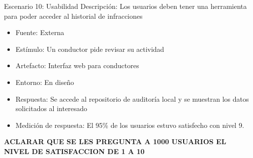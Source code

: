 Escenario 10: Usabilidad
Descripción: Los usuarios deben tener una herramienta para poder acceder al historial de infracciones 
\begin{itemize}
\item Fuente: Externa
\item Estímulo: Un conductor pide revisar su actividad
\item Artefacto: Interfaz web para conductores 
\item Entorno: En diseño 
\item Respuesta: Se accede al repositorio de auditoría local y se muestran los datos solicitados al interesado
\item Medición de respuesta: El 95\% de los usuarios estuvo satisfecho con nivel 9. 
\end{itemize} 
\textbf{ACLARAR QUE SE LES PREGUNTA A 1000 USUARIOS EL NIVEL DE SATISFACCION DE 1 A 10}	
